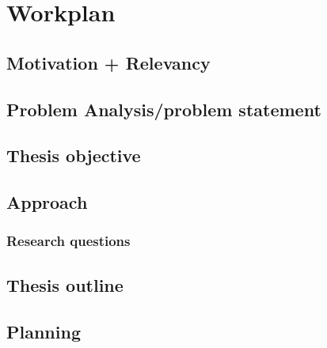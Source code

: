 \chapter{Workplan}
\section{Motivation + Relevancy}

\section{Problem Analysis/problem statement}
\section{Thesis objective}
\section{Approach}
\subsection{Research questions}
\section{Thesis outline}
\section{Planning}